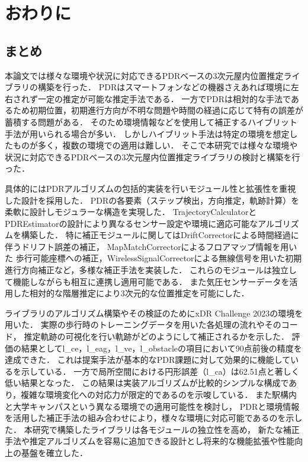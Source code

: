 \chapter{おわりに}
\thispagestyle{myheadings}





\section{まとめ}

本論文では様々な環境や状況に対応できるPDRベースの3次元屋内位置推定ライブラリの構築を行った．
PDRはスマートフォンなどの機器さえあれば環境に左右されず一定の推定が可能な推定手法である．
一方でPDRは相対的な手法であるため初期位置，初期進行方向が不明な問題や時間の経過に応じて特有の誤差が蓄積する問題がある．
そのため環境情報などを使用して補正するハイブリット手法が用いられる場合が多い．
しかしハイブリット手法は特定の環境を想定したものが多く，複数の環境での適用は難しい．
そこで本研究では様々な環境や状況に対応できるPDRベースの3次元屋内位置推定ライブラリの検討と構築を行った．

具体的にはPDRアルゴリズムの包括的実装を行いモジュール性と拡張性を重視した設計を採用した．
PDRの各要素（ステップ検出，方向推定，軌跡計算）を柔軟に設計しモジュラーな構造を実現した．
TrajectoryCalculatorとPDREstimatorの設計により異なるセンサー設定や環境に適応可能なアルゴリズムを構築した．
特に補正モジュールに関してはDriftCorrectorによる時間経過に伴うドリフト誤差の補正，
MapMatchCorrectorによるフロアマップ情報を用いた
歩行可能座標への補正，WirelessSignalCorrectorによる無線信号を用いた初期進行方向補正など，多様な補正手法を実装した．
これらのモジュールは独立して機能しながらも相互に連携し適用可能である．
また気圧センサーデータを活用した相対的な階層推定により3次元的な位置推定を可能にした．

ライブラリのアルゴリズム構築やその検証のためにxDR Challenge 2023の環境を用いた．
実際の歩行時のトレーニングデータを用いた各処理の流れやそのコード，
推定軌跡の可視化を行い軌跡がどのようにして補正されるかを示した．
評価の結果としてl\_ce，l\_eag，l\_ve，l\_obstacleの項目において90点前後の精度を達成できた．
これは提案手法が基本的なPDR課題に対して効果的に機能しているを示している．
一方で局所空間における円形誤差（l\_ca）は62.51点と著しく低い結果となった．
この結果は実装アルゴリズムが比較的シンプルな構成であり，複雑な環境変化への対応力が限定的であるのを示唆している．
また駅構内と大学キャンパスという異なる環境での適用可能性を検討し，
PDRと環境情報を活用した補正手法の組み合わせにより，様々な環境に対応可能であるのを示した．
本研究で構築したライブラリは各モジュールの独立性を高め，
新たな補正手法や推定アルゴリズムを容易に追加できる設計とし将来的な機能拡張や性能向上の基盤を確立した．


